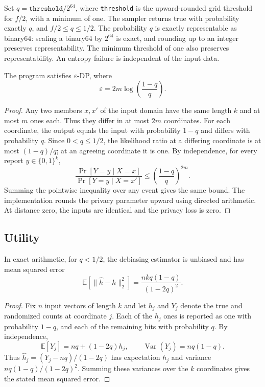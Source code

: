 \documentclass{article}
\begin{document}
\begin{tcolorbox}
\begin{note}
Set $q=\texttt{threshold}/2^{64}$, where \texttt{threshold} is the
upward-rounded grid threshold for $f/2$, with a minimum of one. The sampler returns true
with probability exactly $q$, and $f/2\le q\le 1/2$.
The probability $q$ is exactly representable as binary64: scaling a binary64 by $2^{64}$ is exact, and rounding up to an integer preserves representability.
The minimum threshold of one also preserves representability.
An entropy failure is independent of the input data.
\end{note}
\end{tcolorbox}
\begin{theorem}
\label{thm:privacy-parameter}
	The program  satisfies $\varepsilon$-DP, where
	\begin{equation*}
		\varepsilon = 2m\log\left(\frac{1-q}{q}\right).
	\end{equation*}
\end{theorem}
\begin{proof}
    Any two members $x,x'$ of the input domain have the same length $k$ and at most $m$ ones each.
    Thus they differ in at most $2m$ coordinates.
    For each coordinate, the output equals the input with probability $1-q$ and differs with probability $q$.
    Since $0<q\leq 1/2$, the likelihood ratio at a differing coordinate is at most $(1-q)/q$;
    at an agreeing coordinate it is one.
    By independence, for every report $y\in\{0,1\}^k$,
    \[
        \frac{\Pr[Y=y\mid X=x]}{\Pr[Y=y\mid X=x']}
        \leq \left(\frac{1-q}{q}\right)^{2m}.
    \]
    Summing the pointwise inequality over any event gives the same bound.
    The implementation rounds the privacy parameter upward using directed arithmetic.
    At distance zero, the inputs are identical and the privacy loss is zero.
\end{proof}

\subsection{Utility}

\begin{theorem}
    In exact arithmetic, for $q<1/2$, the debiasing estimator is unbiased and has mean squared error
    \[
        \mathbb{E}[\|\hat h-h\|_2^2]=\frac{nkq(1-q)}{(1-2q)^2}.
    \]
\end{theorem}
\begin{proof}
    Fix $n$ input vectors of length $k$ and let $h_j$ and $Y_j$ denote the true and randomized counts at coordinate $j$.
    Each of the $h_j$ ones is reported as one with probability $1-q$, and each of the remaining bits with probability $q$.
    By independence,
    \[
        \mathbb{E}[Y_j]=nq+(1-2q)h_j,\qquad
        \operatorname{Var}(Y_j)=nq(1-q).
    \]
    Thus $\hat h_j=(Y_j-nq)/(1-2q)$ has expectation $h_j$ and variance $nq(1-q)/(1-2q)^2$.
    Summing these variances over the $k$ coordinates gives the stated mean squared error.
\end{proof}



\end{document}
